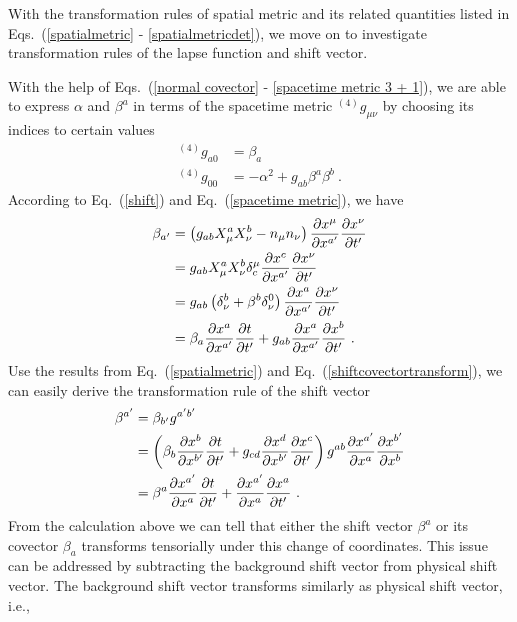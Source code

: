 With the transformation rules of spatial metric and its related quantities listed in Eqs.~(\ref{spatialmetric} - \ref{spatialmetricdet}), we move on to investigate transformation rules of the lapse function and shift vector. 

With the help of Eqs.~(\ref{normal covector} - \ref{spacetime metric 3 + 1}), we are able to express $\alpha$ and $\beta^{a}$ in terms of the spacetime metric $^{\left(4\right)}g_{\mu\nu}$ by choosing its indices to certain values
\begin{align}
^{\left(4\right)}g_{a0} & = \beta_{a}\label{shift}\\
^{\left(4\right)}g_{00} & = -\alpha^2 + g_{ab}\beta^{a}\beta^{b}\label{lapse} \ .
\end{align}
According to Eq.~(\ref{shift}) and Eq.~(\ref{spacetime metric}), we have
\begin{align}\label{shiftcovectortransform}
\beta_{a'} & = \left(g_{ab}X^{a}_{\mu}X^{b}_{\nu} - n_{\mu}n_{\nu}\right)\frac{\partial x^{\mu}}{\partial x^{a'}}\frac{\partial x^{\nu}}{\partial t'}\notag\\
& = g_{ab}X^{a}_{\mu}X^{b}_{\nu}\delta_{c}^{\mu}\frac{\partial x^{c}}{\partial x^{a'}}\frac{\partial x^{\nu}}{\partial t'}\notag\\
& = g_{ab}\left(\delta^{b}_{\nu} + \beta^{b}\delta^{0}_{\nu}\right)\frac{\partial x^{a}}{\partial x^{a'}}\frac{\partial x^{\nu}}{\partial t'}\notag\\
& = \beta_{a}\frac{\partial x^{a}}{\partial x^{a'}}\frac{\partial t}{\partial t'} + g_{ab}\frac{\partial x^{a}}{\partial x^{a'}}\frac{\partial x^{b}}{\partial t'} \ .
\end{align}
Use the results from Eq.~(\ref{spatialmetric}) and Eq.~(\ref{shiftcovectortransform}), we can easily derive the transformation rule of the shift vector
\begin{align}\label{shiftvectortransform}
\beta^{a'} & = \beta_{b'}g^{a'b'}\notag\\
& = \left(\beta_{b}\frac{\partial x^{b}}{\partial x^{b'}}\frac{\partial t}{\partial t'} + g_{cd}\frac{\partial x^{d}}{\partial x^{b'}}\frac{\partial x^{c}}{\partial t'}\right)g^{ab}\frac{\partial x^{a'}}{\partial x^{a}}\frac{\partial x^{b'}}{\partial x^{b}}\notag\\
& = \beta^{a}\frac{\partial x^{a'}}{\partial x^{a}}\frac{\partial t}{\partial t'} + \frac{\partial x^{a'}}{\partial x^{a}}\frac{\partial x^{a}}{\partial t'} \ .
\end{align}
From the calculation above we can tell that either the shift vector $\beta^{a}$ or its covector $\beta_{a}$ transforms tensorially under this change of coordinates. This issue can be addressed by subtracting the background shift vector from physical shift vector. The background shift vector transforms similarly as physical shift vector, i.e., 
